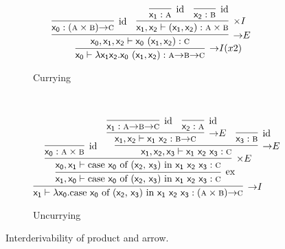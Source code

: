 \begin{figure}
	\centering
	\begin{subfigure}{1\textwidth}
		\[
		\infer[\ii I (x2)]{\term{x_0} \vdash \term{\lambda x_1x_2.x_0~(\term{x_1},\term{x_2})}: \prop{A} \ii \prop{B} \ii \prop{C}}{
			\infer[\ii E]{\term{x_0}, \term{x_1}, \term{x_2} \vdash \term{x_0}~(\term{x_1}, \term{x_2}): \prop{C}}{
				\infer[\Ax]{\term{x_0}: (\prop{A} \times \prop{B}) \ii \prop{C}}{}
				&
				\infer[\times I]{ \term{x_1}, \term{x_2} \vdash (\term{x_1},\term{x_2}): \prop{A} \times \prop{B}}{
					\infer[\Ax]{\term{x_1}: \prop{A}}{}
					&			
					\infer[\Ax]{\term{x_2}: \prop{B}}{}
				}
			}
		}
		\]
		\caption{Currying}
		\label{subfigure:currying}
	\end{subfigure}\\[\midsep]
	\begin{subfigure}{1\textwidth}
		\[
			\infer[\ii I]{\term{x_1} \vdash \term{\lambda x_0.}\cterm{case \term{x_0} of (\term{x_2}, \term{x_3}) in \term{x_1~x_2~x_3}}:(\prop{A} \times \prop{B})\ii \prop{C}}{
				\infer[\Exchange{}]{\term{x_1}, \term{x_0}  \vdash \cterm{case \term{x_0} of (\term{x_2}, \term{x_3}) in \term{x_1~x_2~x_3}}:\prop{C}}{
					\infer[\times E]{\term{x_0}, \term{x_1} \vdash \cterm{case \term{x_0} of (\term{x_2}, \term{x_3}) in \term{x_1~x_2~x_3}}:\prop{C}}{
						\infer[\Ax]{\term{x_0}: \prop{A} \times \prop{B}}{}
						&
						\infer[\ii E]{\term{x_1}, \term{x_2}, \term{x_3} \vdash \term{x_1~x_2~x_3}: \prop{C}}{
							\infer[\ii E]{\term{x_1}, \term{x_2} \vdash \term{x_1~x_2}: \prop{B} \ii \prop{C}}{
								\infer[\Ax]{\term{x_1}: \prop{A} \ii \prop{B} \ii \prop{C}}{}
								&
								\infer[\Ax]{\term{x_2}: \prop{A}}{}
							}
							&
							\infer[\Ax]{\term{x_3}: \prop{B}}{}
						}
					}
				}
			}
		\]
		\caption{Uncurrying}
		\label{subfigure:uncurrying}
	\end{subfigure}
	\caption{Interderivability of product and arrow.}
	\label{figure:curry_uncurry}
\end{figure}


